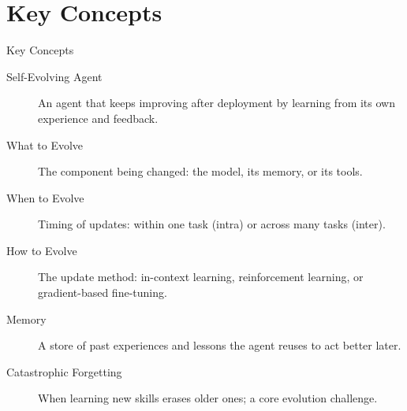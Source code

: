 \documentclass[10pt]{beamer}
\begin{document}
\section{Key Concepts}
\begin{frame}[allowframebreaks]{Key Concepts}
  \begin{description}
    \item[Self-Evolving Agent] An agent that keeps improving after deployment by learning from its own experience and feedback.
    \item[What to Evolve] The component being changed: the model, its memory, or its tools.
    \item[When to Evolve] Timing of updates: within one task (intra) or across many tasks (inter).
    \item[How to Evolve] The update method: in-context learning, reinforcement learning, or gradient-based fine-tuning.
    \item[Memory] A store of past experiences and lessons the agent reuses to act better later.
    \item[Catastrophic Forgetting] When learning new skills erases older ones; a core evolution challenge.
  \end{description}
\end{frame}
\end{document}
